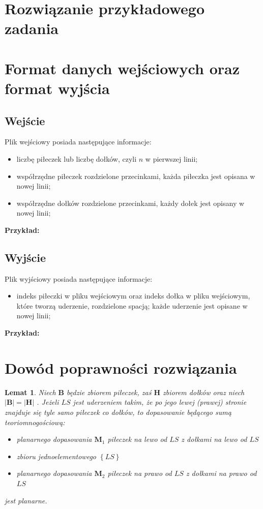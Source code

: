 \documentclass[10pt,a4paper]{article}
\newtheorem{lemma}{Lemat}
\begin{document}
	\section{Rozwiązanie przykładowego zadania}
	
	\section{Format danych wejściowych oraz format wyjścia}
	
	\subsection{Wejście}
	
	Plik wejściowy posiada następujące informacje:
	\begin{itemize}
		\item liczbę piłeczek lub liczbę dołków, czyli $n$ w pierwszej linii;
		\item współrzędne piłeczek rozdzielone przecinkami, każda piłeczka jest opisana w nowej linii;
		\item współrzędne dołków rozdzielone przecinkami, każdy dołek jest opisany w nowej linii;
	\end{itemize}

	\textbf{Przykład:} 
	
	\subsection{Wyjście}
	
	Plik wyjściowy posiada następujące informacje:
	\begin{itemize}
		\item indeks piłeczki w pliku wejściowym oraz indeks dołka w pliku wejściowym, które tworzą uderzenie, rozdzielone spacją; każde uderzenie jest opisane w nowej linii;
	\end{itemize}
	
	\textbf{Przykład:} 
	
	\section{Dowód poprawności rozwiązania}
	
	\begin{lemma}
		Niech $\mathbf{B}$ będzie zbiorem piłeczek, zaś $\mathbf{H}$ zbiorem dołków oraz niech $|\mathbf{B}| = |\mathbf{H}|$ . Jeżeli $LS$ jest uderzeniem takim, że po jego lewej (prawej) stronie znajduje się tyle samo piłeczek co dołków, to dopasowanie będącego sumą teoriomnogościową:
		\begin{itemize}
			\item planarnego dopasowania $\mathbf{M}_{1}$ piłeczek na lewo od $LS$ z dołkami na lewo od $LS$
			\item zbioru jednoelementowego $\left\{LS\right\}$
			\item planarnego dopasowania $\mathbf{M}_{2}$ piłeczek na prawo od $LS$ z dołkami na prawo od $LS$
		\end{itemize}
		jest planarne.
	\end{lemma}
\end{document}
